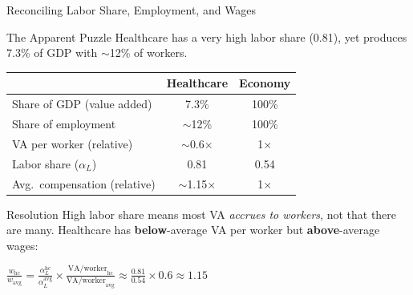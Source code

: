 \begin{frame}{Reconciling Labor Share, Employment, and Wages}

\begin{block}{The Apparent Puzzle}
\small Healthcare has a very high labor share (0.81), yet produces 7.3\% of GDP with $\sim$12\% of workers.
\end{block}

\vspace{-4pt}
\begin{table}
\centering
\footnotesize
\setlength{\tabcolsep}{4pt}
\begin{tabular}{lcc}
 & Healthcare & Economy \\
\hline
Share of GDP (value added) & 7.3\% & 100\% \\
Share of employment & $\sim$12\% & 100\% \\
VA per worker (relative) & $\sim$0.6$\times$ & 1$\times$ \\
Labor share ($\alpha_L$) & 0.81 & 0.54 \\
Avg.\ compensation (relative) & $\sim$1.15$\times$ & 1$\times$ \\
\end{tabular}
\end{table}

\vspace{-6pt}
\begin{alertblock}{Resolution}
\small High labor share means most VA \emph{accrues to workers}, not that there are many. Healthcare has \textbf{below}-average VA per worker but \textbf{above}-average wages:

\vspace{2pt}
$\displaystyle \frac{w_{\text{hc}}}{w_{\text{avg}}} = \frac{\alpha_L^{\text{hc}}}{\alpha_L^{\text{avg}}} \times \frac{\text{VA/worker}_{\text{hc}}}{\text{VA/worker}_{\text{avg}}} \approx \frac{0.81}{0.54} \times 0.6 \approx 1.15$
\end{alertblock}

\end{frame}

